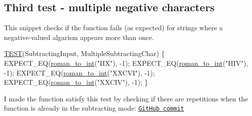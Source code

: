 \subsection*{Third test -\/ multiple negative characters }

This snippet checks if the function fails (as expected) for strings where a negative-\/valued algarism appears more than once.


\begin{DoxyCodeInclude}
\hyperlink{test_simple_8c_aff9fa977573ddab7597e233f1775d7c5}{TEST}(SubtractingInput, MultipleSubtractingChar) \{
    EXPECT\_EQ(\hyperlink{roman_8c_a5d15ad3ed29e4dc0fed9b718523c48c8}{roman\_to\_int}(\textcolor{stringliteral}{"IIX"}), -1);
    EXPECT\_EQ(\hyperlink{roman_8c_a5d15ad3ed29e4dc0fed9b718523c48c8}{roman\_to\_int}(\textcolor{stringliteral}{"IIIV"}), -1);
    EXPECT\_EQ(\hyperlink{roman_8c_a5d15ad3ed29e4dc0fed9b718523c48c8}{roman\_to\_int}(\textcolor{stringliteral}{"XXCVI"}), -1);
    EXPECT\_EQ(\hyperlink{roman_8c_a5d15ad3ed29e4dc0fed9b718523c48c8}{roman\_to\_int}(\textcolor{stringliteral}{"XXCIV"}), -1);
\}
\end{DoxyCodeInclude}
 I made the function satisfy this test by checking if there are repetitions when the function is already in the subtracting mode\+: \href{https://github.com/diogenes1oliveira/libroman/commit/0d80a8dac9f89ff4a4953b23d7aa7936137b7092#diff-3d6fc1bf772186c45fcd2c22d7ecd7b4}{\tt Git\+Hub commit} 